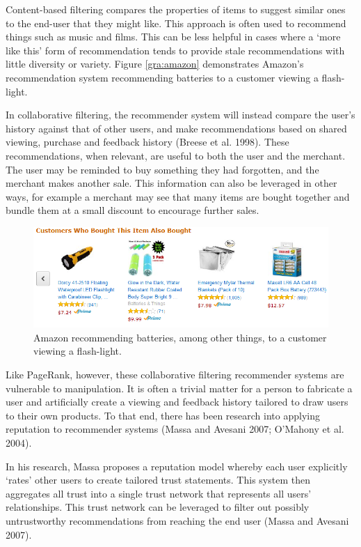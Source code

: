 \documentclass[]{final_report}
\begin{document}
Content-based filtering compares the properties of items to suggest similar ones to the end-user that they might like. This approach is often used to recommend things such as music and films. This can be less helpful in cases where a `more like this' form of recommendation tends to provide stale recommendations with little diversity or variety. Figure \ref{gra:amazon} demonstrates Amazon's recommendation system recommending batteries to a customer viewing a flash-light.

In collaborative filtering, the recommender system will instead compare the user's history against that of other users, and make recommendations based on shared viewing, purchase and feedback history (Breese et al. 1998). These recommendations, when relevant, are useful to both the user and the merchant. The user may be reminded to buy something they had forgotten, and the merchant makes another sale. This information can also be leveraged in other ways, for example a merchant may see that many items are bought together and bundle them at a small discount to encourage further sales.

\begin{figure}[ht!]
\centering
\includegraphics[width=140mm]{chap2/recommender.png}
\caption{Amazon recommending batteries, among other things, to a customer viewing a flash-light.}
\end{figure}\label{gra:amazon}

Like PageRank, however, these collaborative filtering recommender systems are vulnerable to manipulation. It is often a trivial matter for a person to fabricate a user and artificially create a viewing and feedback history tailored to draw users to their own products. To that end, there has been research into applying reputation to recommender systems (Massa and Avesani 2007; O'Mahony et al. 2004).

In his research, Massa proposes a reputation model whereby each user explicitly `rates' other users to create tailored trust statements. This system then aggregates all trust into a single trust network that represents all users' relationships. This trust network can be leveraged to filter out possibly untrustworthy recommendations from reaching the end user (Massa and Avesani 2007).
\end{document}
